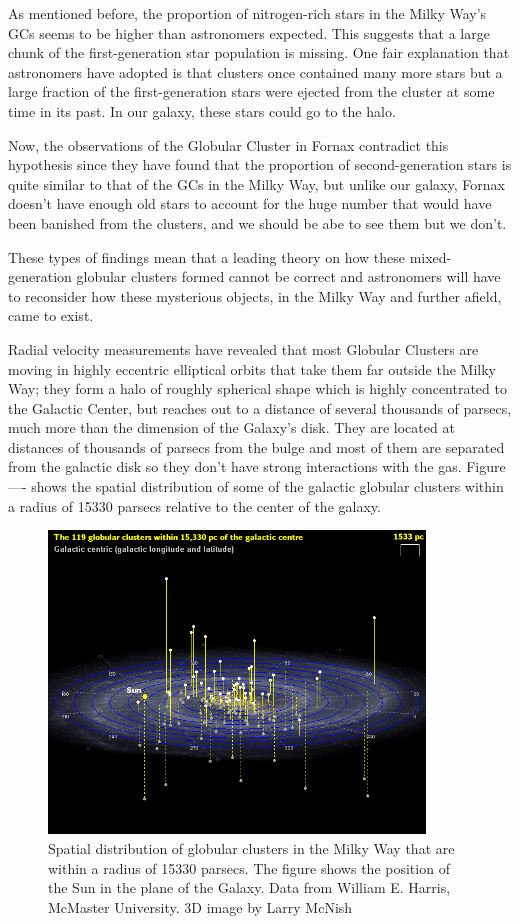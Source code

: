 As mentioned before, the proportion of nitrogen-rich stars in the Milky Way's GCs seems to be higher than astronomers expected. This suggests that a large chunk of the first-generation star population is missing. One fair explanation that astronomers have adopted is that clusters once contained many more stars but a large fraction of the first-generation stars were ejected from the cluster at some time in its past. In our galaxy, these stars could go to the halo.

Now, the observations of the Globular Cluster in Fornax contradict this hypothesis since they have found that the proportion of second-generation stars is quite similar to that of the GCs in the Milky Way, but unlike our galaxy, Fornax doesn't have enough old stars to account for the huge number that would have been banished from the clusters, and we should be abe to see them but we don't.

These types of findings mean that a leading theory on how these mixed-generation globular clusters formed cannot be correct and astronomers will have to reconsider how these mysterious objects, in the Milky Way and further afield, came to exist.

Radial velocity measurements have revealed that most Globular Clusters are moving in highly eccentric elliptical orbits that take them far outside the Milky Way; they form a halo of roughly spherical shape which is highly concentrated to the Galactic Center, but reaches out to a distance of several thousands of parsecs, much more than the dimension of the Galaxy's disk. They are located at distances of thousands of parsecs from the bulge and most of them are separated from the galactic disk so they don't have strong interactions with the gas. Figure ---- shows the spatial distribution of some of the galactic globular clusters within a radius of 15330 parsecs relative to the center of the galaxy.       

\begin{figure}[H]
\centering
\includegraphics[width=10cm]{images/Globulars4.png}
\caption[Iy]{Spatial distribution of globular clusters in the Milky Way that are within a radius of 15330 parsecs. The figure shows the position of the Sun in the plane of the Galaxy. Data from William E. Harris, McMaster University. 3D image by Larry McNish \cite{18}}
\end{figure}

